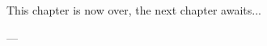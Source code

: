 \bigskip
\noindent
This chapter is now over, the next chapter awaits...

\bigskip
\noindent
\hspace{\fill}
\parbox[b]{0.4\linewidth}{
\raggedleft
\small
--- \theauthor{}\\
\thedate{}
}
\cleardoublepage
%
%
%
%
%
%
%
